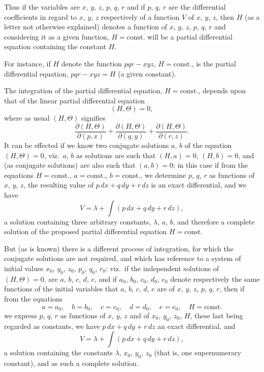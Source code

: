 \documentclass[11pt,a4paper]{book}
\begin{document}
Thus if the variables are $x$, $y$, $z$, $p$, $q$, $r$ and if $p$, $q$, $r$ are the differential coefficients in regard to $x$, $y$, $z$ respectively of a function $V$ of $x$, $y$, $z$, then $H$ (as a letter not otherwise explained) denotes a function of $x$, $y$, $z$, $p$, $q$, $r$ and considering it as a given function, $H = \text{const.}$ will be a partial differential equation containing the constant $H$.

For instance, if $H$ denote the function $pqr - xyz$, $H = \text{const.}$, is the partial differential equation, $pqr - xyz = H$ (a given constant).

The integration of the partial differential equation, $H = \text{const.}$, depends upon that of the linear partial differential equation
\[
(H, \Theta) = 0,
\]
where as usual $(H, \Theta)$ signifies
\[
\frac{\partial(H, \Theta)}{\partial(p, x)} + \frac{\partial(H, \Theta)}{\partial(q, y)} + \frac{\partial(H, \Theta)}{\partial(r, z)}.
\]
It can be effected if we know two conjugate solutions $a$, $b$ of the equation $(H, \Theta) = 0$, viz.~$a$, $b$ as solutions are such that $(H, a) = 0$, $(H, b) = 0$, and (as conjugate solutions) are also such that $(a, b) = 0$; in this case if from the equations $H = \text{const.}$, $a = \text{const.}$, $b = \text{const.}$, we determine $p$, $q$, $r$ as functions of $x$, $y$, $z$, the resulting value of $p\,dx + q\,dy + r\,dz$ is an exact differential, and we have
\[
V = \lambda + \int(p\,dx + q\,dy + r\,dz),
\]
a solution containing three arbitrary constants, $\lambda$, $a$, $b$, and therefore a complete solution of the proposed partial differential equation $H = \text{const.}$

But (as is known) there is a different process of integration, for which the conjugate solutions are not required, and which has reference to a system of initial values $x_0$, $y_0$, $z_0$, $p_0$, $q_0$, $r_0$: viz.~if the independent solutions of $(H, \Theta) = 0$, are $a$, $b$, $c$, $d$, $e$, and if $a_0$, $b_0$, $c_0$, $d_0$, $e_0$ denote respectively the same functions of the initial variables that $a$, $b$, $c$, $d$, $e$ are of $x$, $y$, $z$, $p$, $q$, $r$, then if from the equations
\[
a = a_0, \quad b = b_0, \quad c = c_0, \quad d = d_0, \quad e = e_0, \quad H = \text{const.}
\]
we express $p$, $q$, $r$ as functions of $x$, $y$, $z$ and of $x_0$, $y_0$, $z_0$, $H$, these last being regarded as constants, we have $p\,dx + q\,dy + r\,dz$ an exact differential, and
\[
V = \lambda + \int(p\,dx + q\,dy + r\,dz),
\]
a solution containing the constants $\lambda$, $x_0$, $y_0$, $z_0$ (that is, one supernumerary constant), and as such a complete solution.
\end{document}

